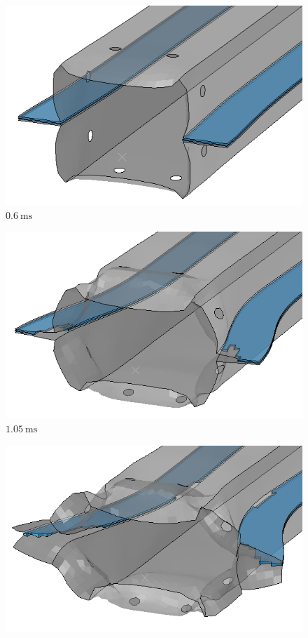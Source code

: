 \documentclass[
documentsize = a4, %
font = cmr, %
typesize = 11, %
printmode = true,
onehalfspacing = true,
language = en, %
titlepage = udciccp, %
degree = pt, %
dedication = true,
acknowledgements = true,
abstract-en = true,
abstract-es = false,
abstract-ga = false,
epigraphs = true,
toc = true,
lof = true,
lot = true,
frontmatterintoc = false,
notation = false,
minimal = false,
]{UDCthesis}
\begin{document}
\begin{figure}
	\centering
	\begin{minipage}[b]{.22\linewidth}
		\centering
		\includegraphics[width=\linewidth]{IMG_CUTRES/tmf1}
		$\SI{0.6}{\ms}$
	\end{minipage}
	\quad
	\begin{minipage}[b]{.22\linewidth}
		\centering
		\includegraphics[width=\linewidth]{IMG_CUTRES/tmf2}
		$\SI{1.05}{\ms}$
	\end{minipage}
	\quad
	\begin{minipage}[b]{.22\linewidth}
		\centering
		\includegraphics[width=\linewidth]{IMG_CUTRES/tmf3}

\end{minipage}
\end{figure}
\end{document}
